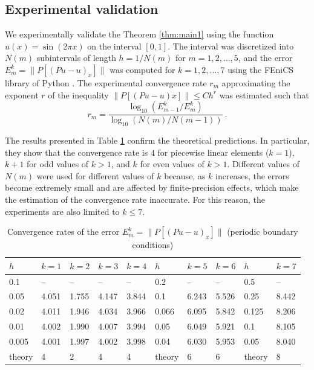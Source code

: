 \documentclass{amsart}
\begin{document}
\subsection{Experimental validation}

We experimentally validate the Theorem \ref{thm:main1} using the function $u(x)=\sin(2\pi x)$ on the interval $[0,1]$. The interval was discretized into $N(m)$  subintervals of length $h = 1/N(m)$ for $m=1,2,\dots,5$, and the error $E_m^k=\|P[(Pu-u)_x]\|$ was computed for $k=1,2,\dots, 7$ using the FEniCS library of Python \cite{Fenics}. The experimental convergence rate $r_m$ approximating the exponent $r$ of the inequality $\|P[(Pu-u)x]\|\leq Ch^r$ was estimated such that 
$$r_m=\frac{\log_{10}(E_{m-1}^k/E_m^k)}{\log_{10}(N(m)/N(m-1))}\ .$$

The results presented in Table \ref{tab:exval1} confirm the theoretical predictions. In particular, they show that the convergence rate is $4$ for piecewise linear elements ($k=1$), $k+1$  for odd values of $k>1$, and $k$ for even values of $k>1$. Different values of $N(m)$ were used for different values of $k$ because, as $k$ increases, the errors become extremely small and are affected by finite-precision effects, which make the estimation of the convergence rate inaccurate. For this reason, the experiments are also limited to $k \le 7$.

\begin{table}[ht!]\label{tab:exval1}
\begin{tabular}{lllll|lll|ll}
\hline
$h$ & $k=1$ & $k=2$ & $k=3$ & $k=4$ & $h$ & $k=5$ & $k=6$ & $h$ & $k=7$ \\ \hline
0.1 & -- & -- & -- & -- & 0.2 & -- & -- & 0.5 & -- \\
0.05 & 4.051 & 1.755 & 4.147 & 3.844 & 0.1 & 6.243 & 5.526 & 0.25 & 8.442 \\ 
0.02 & 4.011 & 1.946 & 4.034 & 3.966 & 0.066 & 6.095 & 5.842 & 0.125 & 8.206 \\
0.01 & 4.002 & 1.990 & 4.007 & 3.994 & 0.05 & 6.049 & 5.921 & 0.1 & 8.105 \\ 
0.005 & 4.001 & 1.997 & 4.002 & 3.998 & 0.04 & 6.030 & 5.953 & 0.05 & 8.040 \\\hline
theory & 4 & 2 & 4 & 4 & theory & 6 & 6 & theory & 8  \\ \hline
\end{tabular}
\caption{Convergence rates of the error $E_m^k=\|P[(Pu-u)_x]\|$ (periodic boundary conditions)}
\end{table}
\end{document}
